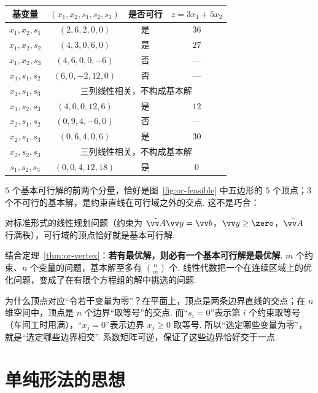 \begin{center}
	{\small
		\begin{tabular}{cccc}
			\toprule
			基变量 & $(x_1,x_2,s_1,s_2,s_3)$ & 是否可行 & $z=3x_1+5x_2$ \\
			\midrule
			$x_1,x_2,s_1$ & $(2,6,2,0,0)$ & 是 & $36$ \\
			$x_1,x_2,s_2$ & $(4,3,0,6,0)$ & 是 & $27$ \\
			$x_1,x_2,s_3$ & $(4,6,0,0,-6)$ & 否 & — \\
			$x_1,s_1,s_2$ & $(6,0,-2,12,0)$ & 否 & — \\
			$x_1,s_1,s_3$ & \multicolumn{3}{c}{三列线性相关，不构成基本解} \\
			$x_1,s_2,s_3$ & $(4,0,0,12,6)$ & 是 & $12$ \\
			$x_2,s_1,s_2$ & $(0,9,4,-6,0)$ & 否 & — \\
			$x_2,s_1,s_3$ & $(0,6,4,0,6)$ & 是 & $30$ \\
			$x_2,s_2,s_3$ & \multicolumn{3}{c}{三列线性相关，不构成基本解} \\
			$s_1,s_2,s_3$ & $(0,0,4,12,18)$ & 是 & $0$ \\
			\bottomrule
		\end{tabular}
	}
\end{center}

$5$ 个基本可行解的前两个分量，恰好是图~\ref{fig:or-feasible} 中五边形的 $5$ 个顶点；$3$ 个不可行的基本解，是约束直线在可行域之外的交点. 这不是巧合：

\begin{theorem}\label{thm:or-basic}
	对标准形式的线性规划问题（约束为 $\tilde{\vv A}\vv y=\vv b$，$\vv y\ge\zero$，$\tilde{\vv A}$ 行满秩），可行域的顶点恰好就是基本可行解.
\end{theorem}

结合定理~\ref{thm:or-vertex}：\textbf{若有最优解，则必有一个基本可行解是最优解}. $m$ 个约束、$n$ 个变量的问题，基本解至多有 $\binom nm$ 个. 线性代数把一个在连续区域上的优化问题，变成了在有限个方程组的解中挑选的问题.

\begin{motivebox}
	为什么顶点对应“令若干变量为零”？在平面上，顶点是两条边界直线的交点；在 $n$ 维空间中，顶点是 $n$ 个边界“取等号”的交点. 而“$s_i=0$”表示第 $i$ 个约束取等号（车间工时用满），“$x_j=0$”表示边界 $x_j\ge0$ 取等号. 所以“选定哪些变量为零”，就是“选定哪些边界相交”. 系数矩阵可逆，保证了这些边界恰好交于一点.
\end{motivebox}

\section{单纯形法的思想}\label{app:or-simplex}

